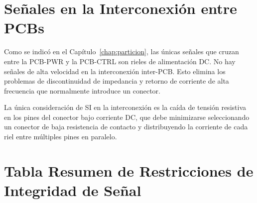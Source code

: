 \section{Señales en la Interconexión entre PCBs}
\label{sec:si_inter_pcb}

Como se indicó en el Capítulo~\ref{chap:particion}, las únicas señales que cruzan
entre la PCB-PWR y la PCB-CTRL son rieles de alimentación DC. No hay señales de
alta velocidad en la interconexión inter-PCB. Esto elimina los problemas de
discontinuidad de impedancia y retorno de corriente de alta frecuencia que
normalmente introduce un conector.

La única consideración de SI en la interconexión es la caída de tensión resistiva
en los pines del conector bajo corriente DC, que debe minimizarse seleccionando
un conector de baja resistencia de contacto y distribuyendo la corriente de cada
riel entre múltiples pines en paralelo.

\section{Tabla Resumen de Restricciones de Integridad de Señal}
\label{sec:si_tabla}

